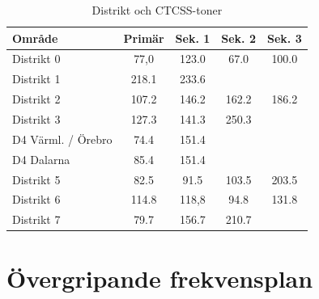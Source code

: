\begin{table}[H]
\centering
\begin{tabular}{lcccc}
	\textbf{Område}    & \textbf{Primär} & \textbf{Sek. 1} & \textbf{Sek. 2} & \textbf{Sek. 3} \\ \hline
	Distrikt 0         & 77,0            & 123.0           & 67.0            & 100.0           \\
	Distrikt 1         & 218.1           & 233.6           &                 &                 \\
	Distrikt 2         & 107.2           & 146.2           & 162.2           & 186.2           \\
	Distrikt 3         & 127.3           & 141.3           & 250.3           &                 \\
	D4 Värml. / Örebro & 74.4            & 151.4           &                 &                 \\
	D4 Dalarna         & 85.4            & 151.4           &                 &                 \\
	Distrikt 5         & 82.5            & 91.5            & 103.5           & 203.5           \\
	Distrikt 6         & 114.8           & 118,8           & 94.8            & 131.8           \\
	Distrikt 7         & 79.7            & 156.7           & 210.7           & 
\end{tabular}
\caption{Distrikt och CTCSS-toner}
\end{table}

\newpage

\section{Övergripande frekvensplan}

